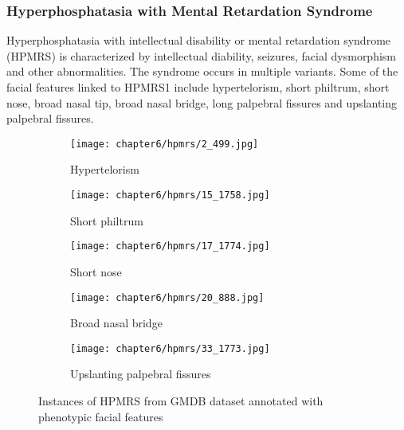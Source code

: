 \documentclass[../report.tex]{subfiles}
\begin{document}
	\subsubsection{Hyperphosphatasia with Mental Retardation Syndrome}
	Hyperphosphatasia with intellectual disability or mental retardation syndrome (HPMRS)  is characterized by intellectual diability, seizures, facial dysmorphism and other abnormalities. The syndrome occurs in multiple variants. Some of the facial features linked to HPMRS1 include hypertelorism, short philtrum, short nose, broad nasal tip, broad nasal bridge, long palpebral fissures and upslanting palpebral fissures.
	 \begin{figure}[H]\label{fig_hpmrs}
	 	\centering
	 	\begin{subfigure}[t]{0.17\textwidth}
	 		\centering
	 		\texttt{[image: chapter6/hpmrs/2\_499.jpg]}
	 		\caption{Hypertelorism}
	 	\end{subfigure}
	 	\begin{subfigure}[t]{0.17\textwidth}
	 		\centering
	 		\texttt{[image: chapter6/hpmrs/15\_1758.jpg]}
	 		\caption{Short philtrum}
	 	\end{subfigure}	
	 	\begin{subfigure}[t]{0.17\textwidth}
	 		\centering
	 		\texttt{[image: chapter6/hpmrs/17\_1774.jpg]}
			\caption{Short nose}
	 	\end{subfigure}	
	 	\begin{subfigure}[t]{0.17\textwidth}
	 		\centering
	 		\texttt{[image: chapter6/hpmrs/20\_888.jpg]}
	 		\caption{Broad nasal bridge}
	 	\end{subfigure}	
	 	\begin{subfigure}[t]{0.17\textwidth}
	 		\centering
	 		\texttt{[image: chapter6/hpmrs/33\_1773.jpg]}
	 		\caption{Upslanting palpebral fissures}
	 	\end{subfigure}	
	 	\caption[Instances of HPMRS from GMDB dataset]{Instances of HPMRS from GMDB dataset annotated with phenotypic facial features}
	 \end{figure}
	 
\end{document}
